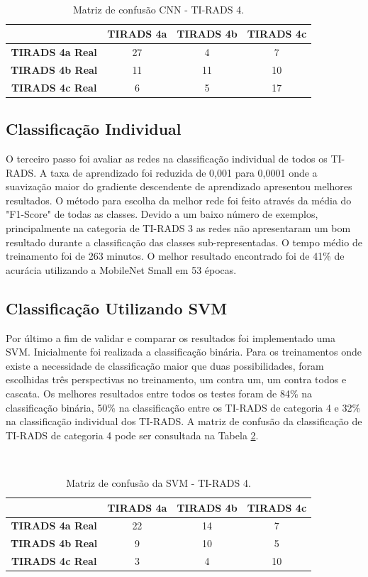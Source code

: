 \documentclass[12pt]{article}
\begin{document}
\begin{table}[H]
\centering
\caption{\centering Matriz de confusão CNN - TI-RADS 4.} \\
\label{table:binary}
\begin{tabular}{cccc}
\toprule
 {} & {TIRADS 4a} & {TIRADS 4b} & {TIRADS 4c} \\
\midrule
\textbf{TIRADS 4a Real} & 27 & 4 & 7 \\
\midrule
\textbf{TIRADS 4b Real} & 11 & 11 & 10 \\
\midrule
\textbf{TIRADS 4c Real} & 6 & 5 & 17 \\
\bottomrule
\end{tabular}
\label{tab:t4cnn}
\end{table}

\subsection{Classificação Individual}
O terceiro passo foi avaliar as redes na classificação individual de todos os TI-RADS. A taxa de aprendizado foi reduzida de 0,001 para 0,0001 onde a suavização maior do gradiente descendente de aprendizado apresentou melhores resultados. O método para escolha da melhor rede foi feito através da média do "F1-Score" de todas as classes. Devido a um baixo número de exemplos, principalmente na categoria de TI-RADS 3 as redes não apresentaram um bom resultado durante a classificação das classes sub-representadas. O tempo médio de treinamento foi de 263 minutos. O melhor resultado encontrado foi de 41\% de acurácia utilizando a MobileNet Small em 53 épocas.

\subsection{Classificação Utilizando SVM}
Por último a fim de validar e comparar os resultados foi implementado uma SVM. Inicialmente foi realizada a classificação binária. Para os treinamentos onde existe a necessidade de classificação maior que duas possibilidades, foram escolhidas três perspectivas no treinamento, um contra um, um contra todos e cascata. Os melhores resultados entre todos os testes foram de 84\% na classificação binária, 50\% na classificação entre os TI-RADS de categoria 4 e 32\% na classificação individual dos TI-RADS. A matriz de confusão da classificação de TI-RADS de categoria 4 pode ser consultada na Tabela \ref{tab:t4svm}.

\begin{table}[H]
\centering
\caption{\centering Matriz de confusão da SVM - TI-RADS 4.} \\
\label{table:binary}
\begin{tabular}{cccc}
\toprule
 {} & {TIRADS 4a} & {TIRADS 4b} & {TIRADS 4c} \\
\midrule
\textbf{TIRADS 4a Real} & 22 & 14 & 7 \\
\midrule
\textbf{TIRADS 4b Real} & 9 & 10 & 5 \\
\midrule
\textbf{TIRADS 4c Real} & 3 & 4 & 10 \\
\bottomrule
\end{tabular}
\label{tab:t4svm}
\end{table}
\end{document}
